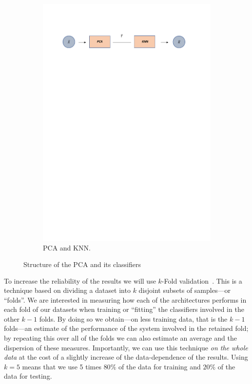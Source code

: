 \begin{figure}[H]
\begin{subfigure}{1\linewidth} 
  \centering
  \includegraphics[width=\linewidth]{Figuras_tfg/Diagram_pca_KNN}
  \caption{PCA and KNN.}
  \label{fig:FigB_PCA_KNN} 
\end{subfigure}
  \caption{Structure of the PCA and its classifiers}
 \label{fig:PCA_architecture}
\end{figure}

To increase the reliability of the results we will use 
$k$-Fold validation~\cite{mur:12}. 
%
This is a technique
based on dividing a dataset into $k$ disjoint subsets of samples---or ``folds''. We are interested in measuring how each of the architectures performs in each fold of our datasets when training or ``fitting'' the classifiers involved in the other $k-1$ folds. By doing so we obtain---on less training data, that is the $k-1$ folds---an estimate of the performance of the system involved in the retained fold; by repeating this over all of the folds we can also estimate an average and the dispersion of these measures. 
%
Importantly, we can use this technique \emph{on the whole data} at the cost of a slightly increase of the data-dependence of the results.
Using $k=5$ means that we use 5 times $80\%$ of the data for training and $20\%$ of the data for testing. 

